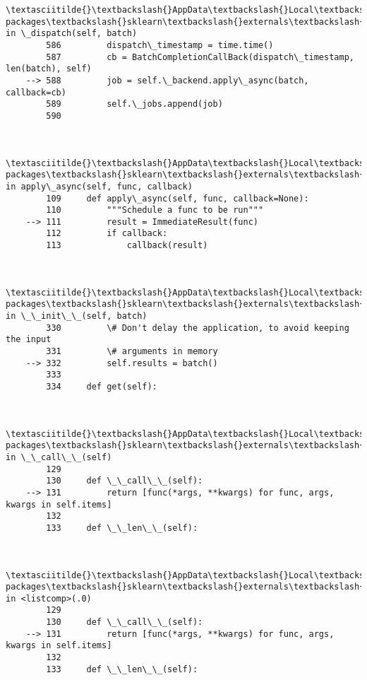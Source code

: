 \documentclass[11pt]{article}
\begin{document}
\begin{Verbatim}[commandchars=\\\{\}]
        \textasciitilde{}\textbackslash{}AppData\textbackslash{}Local\textbackslash{}Continuum\textbackslash{}anaconda3\textbackslash{}lib\textbackslash{}site-packages\textbackslash{}sklearn\textbackslash{}externals\textbackslash{}joblib\textbackslash{}parallel.py in \_dispatch(self, batch)
        586         dispatch\_timestamp = time.time()
        587         cb = BatchCompletionCallBack(dispatch\_timestamp, len(batch), self)
    --> 588         job = self.\_backend.apply\_async(batch, callback=cb)
        589         self.\_jobs.append(job)
        590 
    

        \textasciitilde{}\textbackslash{}AppData\textbackslash{}Local\textbackslash{}Continuum\textbackslash{}anaconda3\textbackslash{}lib\textbackslash{}site-packages\textbackslash{}sklearn\textbackslash{}externals\textbackslash{}joblib\textbackslash{}\_parallel\_backends.py in apply\_async(self, func, callback)
        109     def apply\_async(self, func, callback=None):
        110         """Schedule a func to be run"""
    --> 111         result = ImmediateResult(func)
        112         if callback:
        113             callback(result)
    

        \textasciitilde{}\textbackslash{}AppData\textbackslash{}Local\textbackslash{}Continuum\textbackslash{}anaconda3\textbackslash{}lib\textbackslash{}site-packages\textbackslash{}sklearn\textbackslash{}externals\textbackslash{}joblib\textbackslash{}\_parallel\_backends.py in \_\_init\_\_(self, batch)
        330         \# Don't delay the application, to avoid keeping the input
        331         \# arguments in memory
    --> 332         self.results = batch()
        333 
        334     def get(self):
    

        \textasciitilde{}\textbackslash{}AppData\textbackslash{}Local\textbackslash{}Continuum\textbackslash{}anaconda3\textbackslash{}lib\textbackslash{}site-packages\textbackslash{}sklearn\textbackslash{}externals\textbackslash{}joblib\textbackslash{}parallel.py in \_\_call\_\_(self)
        129 
        130     def \_\_call\_\_(self):
    --> 131         return [func(*args, **kwargs) for func, args, kwargs in self.items]
        132 
        133     def \_\_len\_\_(self):
    

        \textasciitilde{}\textbackslash{}AppData\textbackslash{}Local\textbackslash{}Continuum\textbackslash{}anaconda3\textbackslash{}lib\textbackslash{}site-packages\textbackslash{}sklearn\textbackslash{}externals\textbackslash{}joblib\textbackslash{}parallel.py in <listcomp>(.0)
        129 
        130     def \_\_call\_\_(self):
    --> 131         return [func(*args, **kwargs) for func, args, kwargs in self.items]
        132 
        133     def \_\_len\_\_(self):
    


\end{Verbatim}
\end{document}
